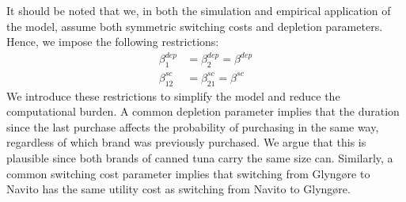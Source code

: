 \\
\\
It should be noted that we, in both the simulation and empirical application of the model, assume both symmetric switching costs and depletion parameters. Hence, we impose the following restrictions:
\begin{align*}
    \beta^{dep}_1 &= \beta^{dep}_2 = \beta^{dep} \\
    \beta^{sc}_{12} &= \beta^{sc}_{21} = \beta^{sc}
\end{align*}
We introduce these restrictions to simplify the model and reduce the computational burden. A common depletion parameter implies that the duration since the last purchase affects the probability of purchasing in the same way, regardless of which brand was previously purchased. We argue that this is plausible since both brands of canned tuna carry the same size can. Similarly, a common switching cost parameter implies that switching from Glyngøre to Navito has the same utility cost as switching from Navito to Glyngøre.  



